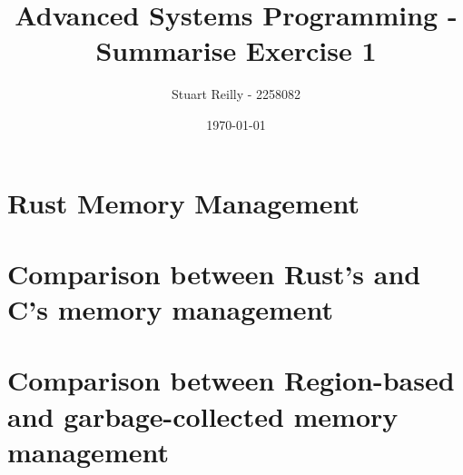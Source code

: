 \documentclass[10pt,a4paper,twocolumn]{article}
\begin{document}
\title{Advanced Systems Programming - Summarise Exercise 1}
\author{Stuart Reilly - 2258082}
\date{\today}

\maketitle

\section{Rust Memory Management}

\section{Comparison between Rust's and C's memory management}

\section{Comparison between Region-based and garbage-collected memory management}
\end{document}

